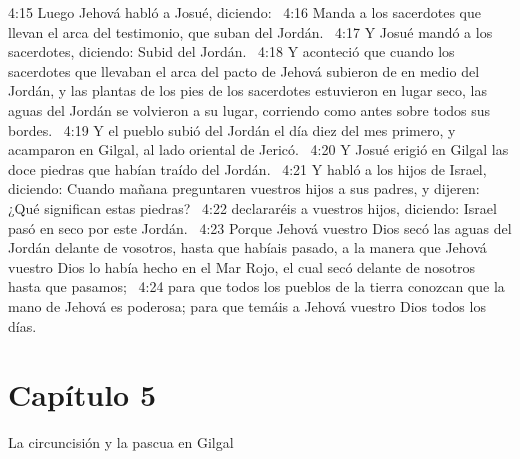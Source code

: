 4:15 Luego Jehová habló a Josué, diciendo:  
4:16 Manda a los sacerdotes que llevan el arca del testimonio, que suban del Jordán.  
4:17 Y Josué mandó a los sacerdotes, diciendo: Subid del Jordán.  
4:18 Y aconteció que cuando los sacerdotes que llevaban el arca del pacto de Jehová subieron de en medio del Jordán, y las plantas de los pies de los sacerdotes estuvieron en lugar seco, las aguas del Jordán se volvieron a su lugar, corriendo como antes sobre todos sus bordes.  
4:19 Y el pueblo subió del Jordán el día diez del mes primero, y acamparon en Gilgal, al lado oriental de Jericó.  
4:20 Y Josué erigió en Gilgal las doce piedras que habían traído del Jordán.  
4:21 Y habló a los hijos de Israel, diciendo: Cuando mañana preguntaren vuestros hijos a sus padres, y dijeren: ¿Qué significan estas piedras?  
4:22 declararéis a vuestros hijos, diciendo: Israel pasó en seco por este Jordán.  
4:23 Porque Jehová vuestro Dios secó las aguas del Jordán delante de vosotros, hasta que habíais pasado, a la manera que Jehová vuestro Dios lo había hecho en el Mar Rojo, el cual secó delante de nosotros hasta que pasamos;  
4:24 para que todos los pueblos de la tierra conozcan que la mano de Jehová es poderosa; para que temáis a Jehová vuestro Dios todos los días.  
\section*{Capítulo 5 }
La circuncisión y la pascua en Gilgal  

